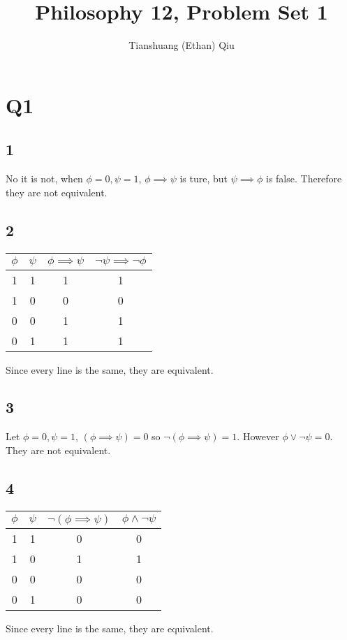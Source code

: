 \documentclass[12pt]{article}
\author{Tianshuang (Ethan) Qiu}
\begin{document}
\title{Philosophy 12, Problem Set 1}
\maketitle

\section{Q1}
\subsection{1}
No it is not, when $\phi = 0, \psi = 1$, $\phi \implies \psi$ is ture, 
but $\psi \implies \phi$ is false. Therefore they are not equivalent.

\subsection{2}
\begin{tabular}{ | c | c | c | c|}
    \hline
    $\phi$ & $\psi$ & $\phi \implies \psi$ & $\neg\psi \implies \neg\phi$\\
    \hline
    1 & 1 & 1 & 1 \\
    \hline
    1 & 0 & 0 & 0 \\
    \hline
    0 & 0 & 1 & 1 \\
    \hline
    0 & 1 & 1 & 1 \\
    \hline
\end{tabular}
\newline
Since every line is the same, they are equivalent.

\subsection{3}
Let $\phi = 0, \psi = 1$, $(\phi \implies \psi) = 0$ so $\neg (\phi \implies \psi) = 1$. 
However $\phi \lor \neg \psi = 0$. They are not equivalent.

\subsection{4}
\begin{tabular}{ | c | c | c | c|}
    \hline
    $\phi$ & $\psi$ & $\neg(\phi \implies \psi)$ & $\phi \land \neg \psi$\\
    \hline
    1 & 1 & 0 & 0 \\
    \hline
    1 & 0 & 1 & 1 \\
    \hline
    0 & 0 & 0 & 0 \\
    \hline
    0 & 1 & 0 & 0 \\
    \hline
\end{tabular}
\newline
Since every line is the same, they are equivalent.
\end{document}
